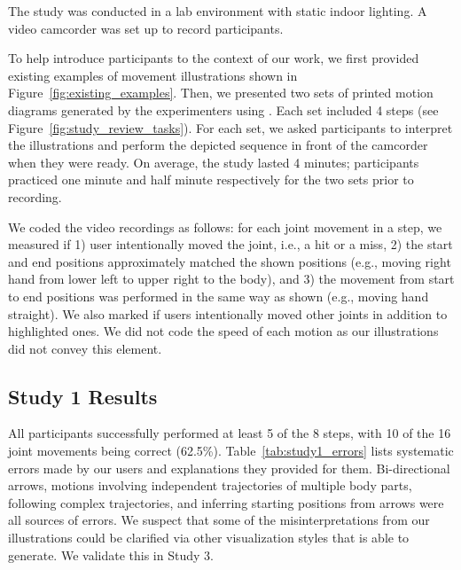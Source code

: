 The study was conducted in a lab environment with static indoor lighting.
%
A video camcorder was set up to record participants.

To help introduce participants to the context of our work, we first provided existing examples of movement illustrations shown in Figure~\ref{fig:existing_examples}.
%
Then, we presented two sets of printed motion diagrams generated by the experimenters using \systemname{}. Each set included 4 steps (see Figure~\ref{fig:study_review_tasks}).
For each set, we asked participants to interpret the illustrations and perform the depicted sequence in front of the camcorder when they were ready. %
%
On average, the study lasted 4 minutes; participants practiced one minute and half minute respectively for the two sets prior to recording.

 We coded the video recordings as follows: for each joint movement in a step, we measured if 1) user intentionally moved the joint, i.e., a hit or a miss, 2) the start and end positions approximately matched the shown positions (e.g., moving right hand from lower left to upper right to the body), and 3) the movement from start to end positions was performed in the same way as shown (e.g., moving hand straight). We also marked if users intentionally moved other joints in addition to highlighted ones. We did not code the speed of each motion as our illustrations did not convey this element.

\subsection{Study 1 Results}
All participants successfully performed at least 5 of the 8 steps, with 10 of the 16 joint movements being correct (62.5\%). %
Table~\ref{tab:study1_errors} lists systematic errors made by our users and explanations they provided for them. Bi-directional arrows, motions involving independent trajectories of multiple body parts, following  complex trajectories, and inferring starting positions from arrows were all sources of errors. We suspect that some of the misinterpretations from our illustrations could be clarified via other visualization styles that \systemname{} is able to generate. We validate this in Study 3.

